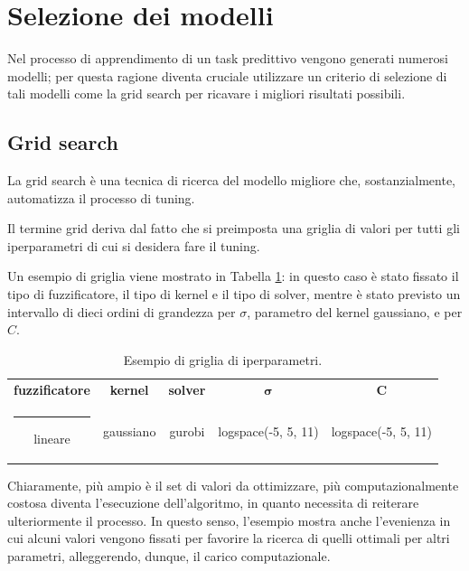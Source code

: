 \documentclass[12pt]{report}
\makeatletter
\theoremstyle{definition}
\newcommand{\thickhline}{%
    \noalign {\ifnum 0=`}\fi \hrule height 1pt
    \futurelet \reserved@a \@xhline
}
\makeatother
\begin{document}
\section{Selezione dei modelli}\label{modelselection}
Nel processo di apprendimento di un task predittivo vengono generati numerosi modelli; per questa ragione diventa cruciale utilizzare un criterio di selezione di tali modelli come la grid search per ricavare i migliori risultati possibili.

\subsection{Grid search}\label{gs}
La grid search è una tecnica di ricerca del modello migliore che, sostanzialmente, automatizza il processo di tuning.

Il termine grid deriva dal fatto che si preimposta una griglia di valori per tutti gli iperparametri di cui si desidera fare il tuning.

Un esempio di griglia viene mostrato in Tabella \ref{grid}: in questo caso è stato fissato il tipo di fuzzificatore, il tipo di kernel e il tipo di solver, mentre è stato previsto un intervallo di dieci ordini di grandezza per $\sigma$, parametro del kernel gaussiano, e per $C$.
\begin{table}[!h]
\centering
 \begin{tabular}{|c|c|c|c|c|} 
 \hline
\textbf{fuzzificatore} & \textbf{kernel} & \textbf{solver} & $\bm{\sigma}$ & $\mathbf{C}$ 
\\ [0.5ex] 
 \thickhline
 lineare & gaussiano & gurobi & logspace(-5, 5, 11) & logspace(-5, 5, 11) \\ 
 \hline
\end{tabular}
\caption{Esempio di griglia di iperparametri.}
\label{grid}
\end{table}
Chiaramente, più ampio è il set di valori da ottimizzare, più computazionalmente costosa diventa l'esecuzione dell'algoritmo, in quanto necessita di reiterare ulteriormente il processo. In questo senso, l'esempio mostra anche l'evenienza in cui alcuni valori vengono fissati per favorire la ricerca di quelli ottimali per altri parametri, alleggerendo, dunque, il carico computazionale.
\end{document}
